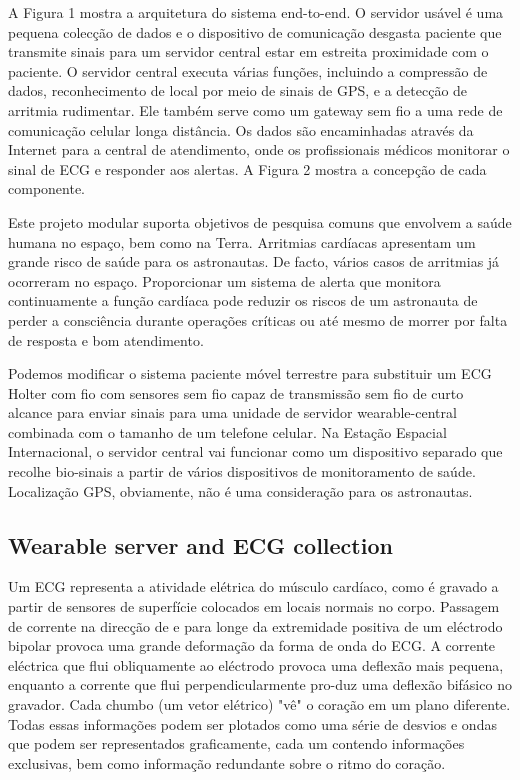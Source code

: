 \documentclass[a4paper,12pt]{article}
\begin{document}
A Figura 1 mostra a arquitetura do sistema end-to-end. O servidor usável é uma pequena colecção de dados e o dispositivo de comunicação desgasta paciente que transmite sinais para um servidor central estar em estreita proximidade com o paciente. O servidor central executa várias funções, incluindo a compressão de dados, reconhecimento de local por meio de sinais de GPS, e a detecção de arritmia rudimentar. Ele também serve como um gateway sem fio a uma rede de comunicação celular longa distância. Os dados são encaminhadas através da Internet para a central de atendimento, onde os profissionais médicos monitorar o sinal de ECG e responder aos alertas. A Figura 2 mostra a concepção de cada componente.

Este projeto modular suporta objetivos de pesquisa comuns que envolvem a saúde humana no espaço, bem como na Terra. Arritmias cardíacas apresentam um grande risco de saúde para os astronautas. De facto, vários casos de arritmias já ocorreram no espaço. Proporcionar um sistema de alerta que monitora continuamente a função cardíaca pode reduzir os riscos de um astronauta de perder a consciência durante operações críticas ou até mesmo de morrer por falta de resposta e bom atendimento.

Podemos modificar o sistema paciente móvel terrestre para substituir um ECG Holter com fio com sensores sem fio capaz de transmissão sem fio de curto alcance para enviar sinais para uma unidade de servidor wearable-central combinada com o tamanho de um telefone celular. Na Estação Espacial Internacional, o servidor central vai funcionar como um dispositivo separado que recolhe bio-sinais a partir de vários dispositivos de monitoramento de saúde. Localização GPS, obviamente, não é uma consideração para os astronautas.

\subsection{Wearable server and ECG collection}

Um ECG representa a atividade elétrica do músculo cardíaco, como é gravado a partir de sensores de superfície colocados em locais normais no corpo. Passagem de corrente na direcção de e para longe da extremidade positiva de um eléctrodo bipolar provoca uma grande deformação da forma de onda do ECG. A corrente eléctrica que flui obliquamente ao eléctrodo provoca uma deflexão mais pequena, enquanto a corrente que flui perpendicularmente pro-duz uma deflexão bifásico no gravador. Cada chumbo (um vetor elétrico) "vê" o coração em um plano diferente. Todas essas informações podem ser plotados como uma série de desvios e ondas que podem ser representados graficamente, cada um contendo informações exclusivas, bem como informação redundante sobre o ritmo do coração.
\end{document}
